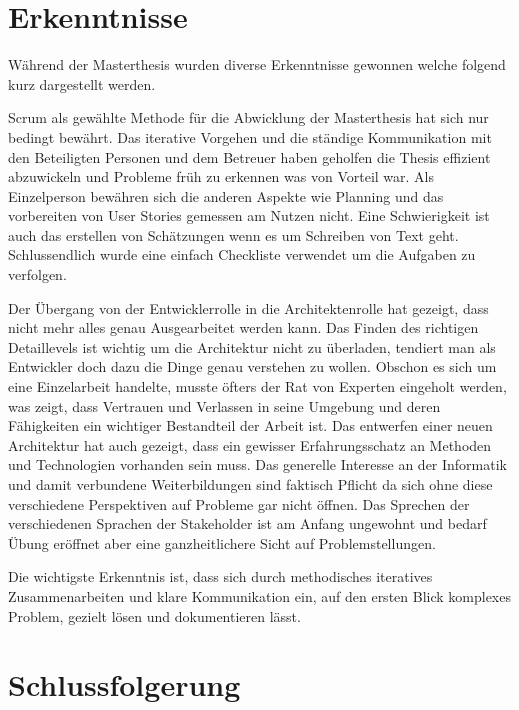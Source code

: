 \chapter{Erkenntnisse}

Während der Masterthesis wurden diverse Erkenntnisse gewonnen welche folgend kurz dargestellt werden.\newline

Scrum als gewählte Methode für die Abwicklung der Masterthesis hat sich nur bedingt bewährt. Das iterative Vorgehen und die ständige Kommunikation mit den Beteiligten Personen und dem Betreuer haben geholfen die Thesis effizient abzuwickeln und Probleme früh zu erkennen was von Vorteil war. Als Einzelperson bewähren sich die anderen Aspekte wie Planning und das vorbereiten von User Stories gemessen am Nutzen nicht. Eine Schwierigkeit ist auch das erstellen von Schätzungen wenn es um Schreiben von Text geht. Schlussendlich wurde eine einfach Checkliste verwendet um die Aufgaben zu verfolgen.\newline

Der Übergang von der Entwicklerrolle in die Architektenrolle hat gezeigt, dass nicht mehr alles genau Ausgearbeitet werden kann. Das Finden des richtigen Detaillevels ist wichtig um die Architektur nicht zu überladen, tendiert man als Entwickler doch dazu die Dinge genau verstehen zu wollen. Obschon es sich um eine Einzelarbeit handelte, musste öfters der Rat von Experten eingeholt werden, was zeigt, dass Vertrauen und Verlassen in seine Umgebung und deren Fähigkeiten ein wichtiger Bestandteil der Arbeit ist. Das entwerfen einer neuen Architektur hat auch gezeigt, dass ein gewisser Erfahrungsschatz an Methoden und Technologien vorhanden sein muss. Das generelle Interesse an der Informatik und damit verbundene Weiterbildungen sind faktisch Pflicht da sich ohne diese verschiedene Perspektiven auf Probleme gar nicht öffnen. Das Sprechen der verschiedenen Sprachen der Stakeholder ist am Anfang ungewohnt und bedarf Übung eröffnet aber eine ganzheitlichere Sicht auf Problemstellungen.\newline

Die wichtigste Erkenntnis ist, dass sich durch methodisches iteratives Zusammenarbeiten und klare Kommunikation ein, auf den ersten Blick komplexes Problem, gezielt lösen und dokumentieren lässt.

\chapter{Schlussfolgerung}


